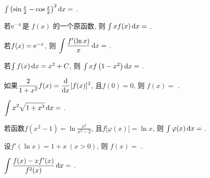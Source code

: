 \begin{problem}
$\int \left( \sin\frac{x}{2} - \cos\frac{x}{2} \right)^{2}\mathop{}\!\mathrm{d} x =$
.

\end{problem}           

\begin{problem} 若$\mathrm{e}^{- x}$是 $f(x)$ 的一个原函数, 则 $\int {xf(x)\mathop{}\!\mathrm{d}x} =$
.

\end{problem}           

\begin{problem} 若$f(x) = \mathrm{e}^{- x}$, 则 $\displaystyle \int \frac{f'(\ln x)}{x}\mathop{}\!\mathrm{d} x =$
.

\end{problem}           

\begin{problem} 若$\int f(x)\mathop{}\!\mathrm{d} x = x^{2} + C$, 则
$\int xf\left( 1 - x^{2} \right)\mathop{}\!\mathrm{d} x =$ 
.

\end{problem}           

\begin{problem}
如果$\displaystyle \frac{2}{1 + x^{2}}f(x) = \frac{\d}{{\dx}}\lbrack f(x)\rbrack^{2}$,
且$f\left( 0 \right) = 0$, 则 $f(x) =$ 
.

\end{problem}           

\begin{problem} $\displaystyle \int x^{2}\sqrt{1 + x^{3}}\mathop{}\!\mathrm{d} x =$ 
.

\end{problem}           

\begin{problem}
若函数$\displaystyle f\left( x^{2} - 1 \right) = \ln\frac{x^{2}}{x^{2} - 2}$, 且$f\lbrack\varphi(x)\rbrack = \ln x$,
则 $\int \varphi(x)\mathop{}\!\mathrm{d} x =$ 
.

\end{problem}           

\begin{problem} 设$f'(\ln x) = 1 + x \ (x > 0)$, 则 $f(x) =$
.

\end{problem}           

\begin{problem} $\displaystyle \int \frac{f(x) - xf'(x)}{f^{2}(x)}\mathop{}\!\mathrm{d} x =$ 
.

\end{problem}           

